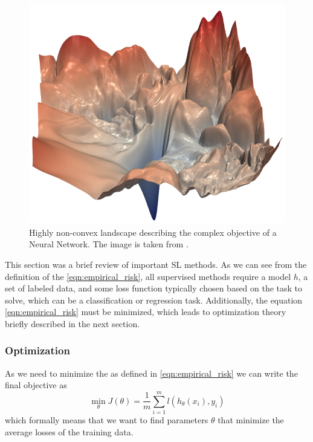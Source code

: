 \begin{figure}[H]%
    \centering
    \includegraphics[width=\imgWidthM]{images/non_convex_landscape.png}
    \caption[Non-convex landscape of objective]{Highly non-convex landscape describing the complex objective of a Neural Network. The image is taken from \cite{NEURIPS2018_a41b3bb3}.}
    \label{non_convex_landscape}
\end{figure}
This section was a brief review of important \ac{SL} methods. As we can see from the definition of the  \ref{eqn:empirical_risk}, all supervised methods require a model $h$, a set of labeled data, and some loss function typically chosen based on the task to solve, which can be a classification or regression task. Additionally, the equation \ref{eqn:empirical_risk} must be minimized, which leads to optimization theory briefly described in the next section.

\subsubsection*{Optimization}
\label{subsubsec:optimization}
As we need to minimize the  as defined in \ref{eqn:empirical_risk} we can write the final objective as
\begin{equation}
    \mathop{\min}_{\theta} J(\theta) = \frac{1}{m}\sum_{i=1}^m l(h_{\theta}(x_i),y_i)
\end{equation}
which formally means that we want to find parameters $\theta$ that minimize the average losses of the training data.

